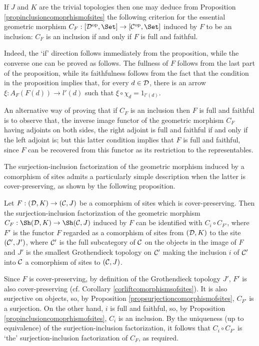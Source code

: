 \documentclass[a4paper,12pt]{article}
\begin{document}
\begin{remark}\label{remarkinclusion}
	If $J$ and $K$ are the trivial topologies then one may deduce from Proposition \ref{propinclusioncomoprhismofsites} the following criterion for the essential geometric morphism $C_{F}:[{\cal D}^{\textup{op}},\Set]\to [{\cal C}^{\textup{op}},\Set]$ induced by $F$ to be an inclusion: $C_{F}$ is an inclusion if and only if $F$ is full and faithful. 
	
	Indeed, the `if' direction follows immediately from the proposition, while the converse one can be proved as follows. The fullness of $F$ follows from the last part of the proposition, while its faithfulness follows from the fact that the condition in the proposition implies that, for every $d\in {\cal D}$, there is an arrow $\xi:A_{F}(F(d))\to l'(d)$ such that $\xi\circ \chi_{d}=1_{l'(d)}$. 
	
	An alternative way of proving that if $C_{F}$ is an inclusion then $F$ is full and faithful is to observe that, the inverse image functor of the geometric morphism $C_{F}$ having adjoints on both sides, the right adjoint is full and faithful if and only if the left adjoint is; but this latter condition implies that $F$ is full and faithful, since $F$ can be recovered from this functor as its restriction to the representables.
\end{remark}


	
The surjection-inclusion factorization of the geometric morphism induced by a comorphism of sites admits a particularly simple description when the latter is cover-preserving, as shown by the following proposition. 

\begin{proposition}\label{propsurinclfactorizationcomorphismofsites}
	Let $F:({\cal D}, K)\to ({\cal C}, J)$ be a comorphism of sites which is cover-preserving. Then the surjection-inclusion factorization of the geometric morphism $C_{F}:\Sh({\cal D}, K)\to \Sh({\cal C}, J)$ induced by $F$ can be identified with $C_{i}\circ C_{F'}$, where $F'$ is the functor $F$ regarded as a comorphism of sites from $({\cal D}, K)$ to the site $({\cal C}', J')$, where ${\cal C}'$ is the full subcategory of $\cal C$ on the objects in the image of $F$ and $J'$ is the smallest Grothendieck topology on ${\cal C}'$ making the inclusion $i$ of ${\cal C}'$ into ${\cal C}$ a comorphism of sites to $({\cal C}, J)$.	
\end{proposition}

\begin{proofs}
	Since $F$ is cover-preserving, by definition of the Grothendieck topology $J'$, $F'$ is also cover-preserving (cf. Corollary \ref{corliftcomorphismsofsites}). It is also surjective on objects, so, by Proposition \ref{propsurjectioncomorphismofsites}, $C_{F'}$ is a surjection. On the other hand, $i$ is full and faithful, so, by Proposition \ref{propinclusioncomoprhismofsites}, $C_{i}$ is an inclusion. By the uniqueness (up to equivalence) of the surjection-inclusion factorization, it follows that $C_{i}\circ C_{F'}$ is `the' surjection-inclusion factorization of $C_{F}$, as required.
\end{proofs}
\end{document}
